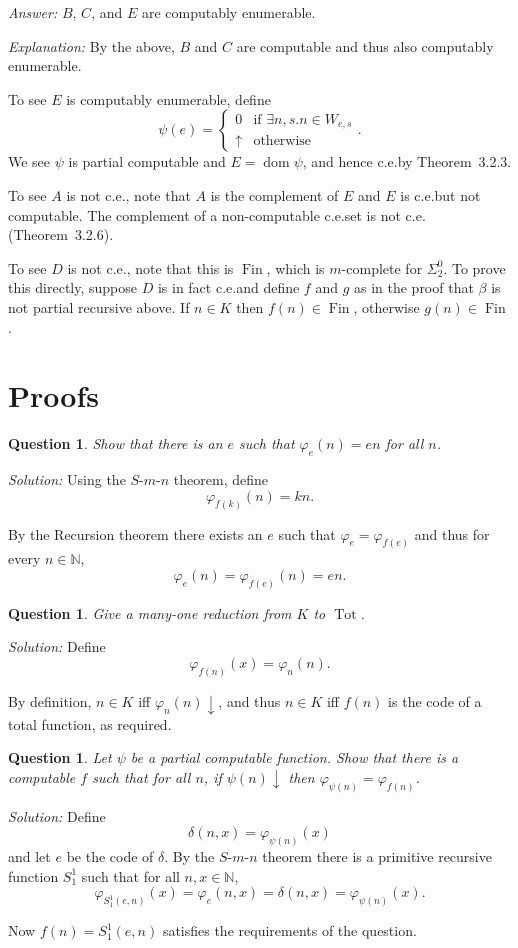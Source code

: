 \documentclass{article}
\newtheorem{question}[theorem]{Question}
\newcommand{\terminates}{\!\!\downarrow}
\DeclareMathOperator{\Fin}{Fin}
\DeclareMathOperator{\Tot}{Tot}
\DeclareMathOperator{\dom}{dom}
\begin{document}
  \noindent\emph{Answer:} $B$, $C$, and $E$ are computably enumerable.

  \noindent\emph{Explanation:} By the above, $B$ and $C$ are computable and thus also computably enumerable.

  To see $E$ is computably enumerable, define
  \[
    \psi(e) =
    \begin{cases}
      0& \text{if $\exists n, s. n \in W_{e, s}$}\\
      \uparrow& \text{otherwise}
    \end{cases}.
  \]
  We see $\psi$ is partial computable and $E = \dom \psi$, and hence c.e.\@ by Theorem~3.2.3.

  To see $A$ is not c.e., note that $A$ is the complement of $E$ and $E$ is c.e.\@ but not computable.  The complement
  of a non-computable c.e.\@ set is not c.e.\@ (Theorem~3.2.6).

  To see $D$ is not c.e., note that this is $\Fin$, which is $m$-complete for $\Sigma^0_2$.  To prove this directly,
  suppose $D$ is in fact c.e.\@ and define $f$ and $g$ as in the proof that $\beta$ is not partial recursive above.
  If $n \in K$ then $f(n) \in \Fin$, otherwise $g(n) \in \Fin$.

  \section{Proofs}

  \begin{question}
    Show that there is an $e$ such that $\varphi_e(n) = en$ for all $n$.
  \end{question}

  \noindent\emph{Solution:} Using the $S$-$m$-$n$ theorem, define
  \[
    \varphi_{f(k)}(n) = kn.
  \]

  By the Recursion theorem there exists an $e$ such that $\varphi_e = \varphi_{f(e)}$ and thus for every $n \in
  \mathbb{N}$,
  \[
    \varphi_e(n) = \varphi_{f(e)}(n) = en.
  \]

  \begin{question}
    Give a many-one reduction from $K$ to $\Tot$.
  \end{question}

  \noindent\emph{Solution:} Define
  \[
    \varphi_{f(n)}(x) = \varphi_n(n).
  \]

  By definition, $n \in K$ iff $\varphi_n(n)\terminates$, and thus $n \in K$ iff $f(n)$ is the code of a total function,
  as required.

  \begin{question}
    Let $\psi$ be a partial computable function.  Show that there is a computable
    $f$ such that for all $n$, if $\psi(n)\terminates$ then $\varphi_{\psi(n)}
    = \varphi_{f(n)}$.
  \end{question}

  \noindent\emph{Solution:} Define
  \[
    \delta(n, x) = \varphi_{\psi(n)}(x)
  \]
  and let $e$ be the code of $\delta$.  By the $S$-$m$-$n$ theorem there is a primitive recursive function $S^1_1$
  such that for all $n, x \in \mathbb{N}$,
  \[
    \varphi_{S^1_1(e, n)}(x) = \varphi_e(n, x) = \delta(n, x) = \varphi_{\psi(n)}(x).
  \]

  Now $f(n) = S^1_1(e, n)$ satisfies the requirements of the question.
\end{document}
